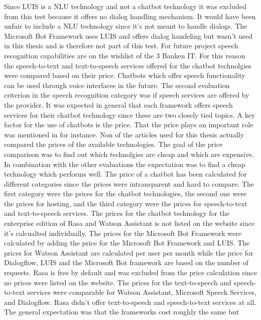 Since LUIS is a NLU technology and not a chatbot technology it was excluded from this test
because it offers no dialog handling mechanism.
It would have been unfair to include a NLU technology since it's not meant to handle 
dialogs.
The Microsoft Bot Framework uses LUIS and offers dialog handeling but wasn't used in 
this thesis and is therefore not part of this test.
For future project speech recognition capabilities are on the wishlist of the 
3 Banken IT.
For this reason the speech-to-text and text-to-speech services offered for the 
chatbot technolgies were compared based on their price.
Chatbots which offer speech functionality can be used through 
voice interfaces in the future.
The second evaluation criterion in the speech recognition category was
if speech services are offered by the provider. 
It was expected in general that each framework offers speech services 
for their chatbot technology since these are two closely tied topics.
A key factor for the use of chatbots is the price.
That the price plays an important role was mentioned in \citet{buiildChatbotsPython} 
for instance.
Non of the articles used for this thesis actually compared the prices of the 
available technologies.
The goal of the price comparison was to find out which technolgies are cheap and which are 
expensive.
In combination with the other evaluations the expectation was to find a cheap technology 
which performs well.
The price of a chatbot has been calculated for different categories since the 
prices were intransparent and hard to compare.
The first category were the prices for the chatbot technologies, the second 
one were the prices for hosting, and the third category were the prices 
for speech-to-text and text-to-speech services.
The prices for the chatbot technology for the enterprise edition of Rasa 
and Watson Assistant is not listed on the website since it's calcualted 
individually.
The prices for the Microsoft Bot Framework were calculated by adding the price
for the Microsoft Bot Framework and LUIS.
The prices for Watson Assistant are calculated per user per month while the 
price for Dialogflow, LUIS and the Microsoft Bot framework are based on the
number of requests.
Rasa is free by default and was excluded from the price calculation since 
no prices were listed on the website.
The prices for the text-to-speech and speech-to-text services were comparable for
Watson Assistant, Microsoft Speech Services, and Dialogflow.
Rasa didn't offer text-to-speech and speech-to-text services at all.
The general expectation was that the frameworks cost roughly the same but 
